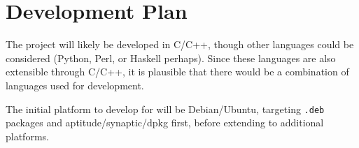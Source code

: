 \documentclass[12pt]{article}
\begin{document}
    \section{Development Plan}
        The project will likely be developed in C/C++, though other languages could be considered (Python, Perl, or Haskell perhaps).  Since these languages are also extensible through C/C++, it is plausible that there would be a combination of languages used for development.

        The initial platform to develop for will be Debian/Ubuntu, targeting \verb+.deb+ packages and aptitude/synaptic/dpkg first, before extending to additional platforms.
    
\end{document}
